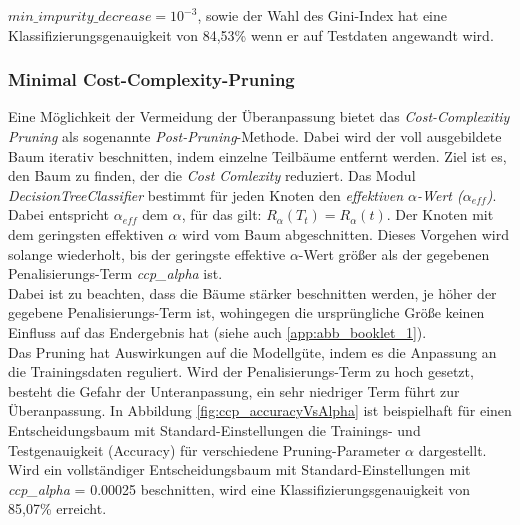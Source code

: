 $min\_impurity\_decrease = 10^{-3}$, sowie der Wahl des Gini-Index hat eine Klassifizierungsgenauigkeit von 84,53\% wenn er auf Testdaten angewandt wird.


\subsubsection{Minimal Cost-Complexity-Pruning}
Eine Möglichkeit der Vermeidung der Überanpassung bietet das \emph{Cost-Complexitiy Pruning} als sogenannte \emph{Post-Pruning}-Methode. Dabei wird der voll ausgebildete Baum iterativ beschnitten, indem einzelne Teilbäume entfernt werden. Ziel ist es, den Baum zu finden, der die \emph{Cost Comlexity} reduziert. Das Modul \emph{DecisionTreeClassifier} bestimmt für jeden Knoten den \emph{effektiven $\alpha$-Wert ($\alpha_{eff}$)}. Dabei entspricht $\alpha_{eff}$ dem $\alpha$, für das gilt: $R_{\alpha}(T_{t})=R_{\alpha}(t)$. Der Knoten mit dem geringsten effektiven $\alpha$ wird vom Baum abgeschnitten. Dieses Vorgehen wird solange wiederholt, bis der geringste effektive $\alpha$-Wert größer als der gegebenen Penalisierungs-Term \emph{ccp\_alpha} ist.\\
\noindent \hspace*{7mm}
Dabei ist zu beachten, dass die Bäume stärker beschnitten werden, je höher der gegebene Penalisierungs-Term ist, wohingegen die ursprüngliche Größe keinen Einfluss auf das Endergebnis hat (siehe auch \ref{app:abb_booklet_1}).\\
\noindent \hspace*{7mm}
Das Pruning hat Auswirkungen auf die Modellgüte, indem es die Anpassung an die Trainingsdaten reguliert. Wird der Penalisierungs-Term zu hoch gesetzt, besteht die Gefahr der Unteranpassung, ein sehr niedriger Term führt zur Überanpassung. In Abbildung \ref{fig:ccp_accuracyVsAlpha} ist beispielhaft für einen Entscheidungsbaum mit Standard-Einstellungen die Trainings- und Testgenauigkeit (Accuracy) für verschiedene Pruning-Parameter $\alpha$ dargestellt. Wird ein vollständiger Entscheidungsbaum mit Standard-Einstellungen mit \emph{ccp\_alpha} = 0.00025 beschnitten, wird eine Klassifizierungsgenauigkeit von 85,07\% erreicht.

